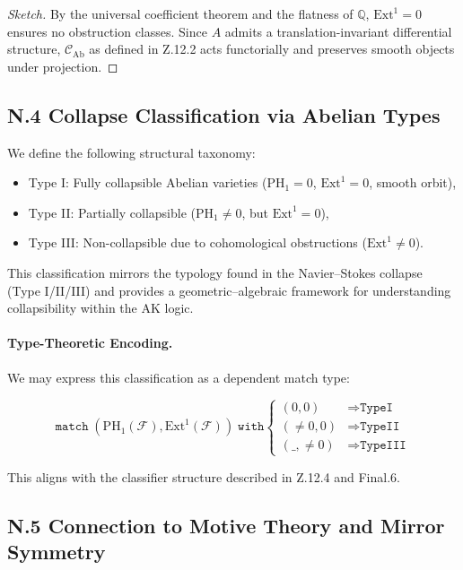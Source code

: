 \documentclass[11pt]{article}
\begin{document}
\begin{axiom}
\begin{axiom}
{{\begin{proof}[Sketch]
By the universal coefficient theorem and the flatness of \( \mathbb{Q} \), \( \mathrm{Ext}^1 = 0 \) ensures no obstruction classes.  
Since \( A \) admits a translation-invariant differential structure, \( \mathcal{C}_{\mathrm{Ab}} \) as defined in Z.12.2 acts functorially and preserves smooth objects under projection.
\end{proof}


\subsection*{N.4 Collapse Classification via Abelian Types}

We define the following structural taxonomy:

\begin{itemize}
  \item Type I: Fully collapsible Abelian varieties (\( \mathrm{PH}_1 = 0 \), \( \mathrm{Ext}^1 = 0 \), smooth orbit),
  \item Type II: Partially collapsible (\( \mathrm{PH}_1 \neq 0 \), but \( \mathrm{Ext}^1 = 0 \)),
  \item Type III: Non-collapsible due to cohomological obstructions (\( \mathrm{Ext}^1 \neq 0 \)).
\end{itemize}

This classification mirrors the typology found in the Navier–Stokes collapse (Type I/II/III) and provides a geometric–algebraic framework for understanding collapsibility within the AK logic.

\paragraph{Type-Theoretic Encoding.}

We may express this classification as a dependent match type:

\[
\texttt{match} \; (\mathrm{PH}_1(\mathcal{F}), \mathrm{Ext}^1(\mathcal{F})) \; \texttt{with}
\begin{cases}
(0, 0) &\Rightarrow \texttt{TypeI} \\
(\neq 0, 0) &\Rightarrow \texttt{TypeII} \\
(\_, \neq 0) &\Rightarrow \texttt{TypeIII}
\end{cases}
\]

This aligns with the classifier structure described in Z.12.4 and Final.6.


\subsection*{N.5 Connection to Motive Theory and Mirror Symmetry}

}}
\end{axiom}
\end{axiom}
\end{document}
